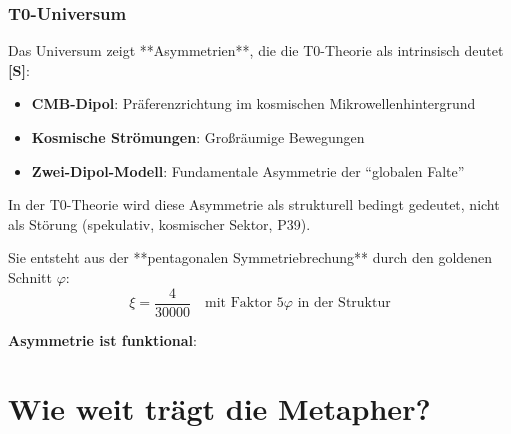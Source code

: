 	\subsubsection{T0-Universum}

	Das Universum zeigt **Asymmetrien**, die die T0-Theorie als intrinsisch deutet \textbf{[S]}:

	\begin{itemize}
		\item \textbf{CMB-Dipol}: Präferenzrichtung im kosmischen Mikrowellenhintergrund
		\item \textbf{Kosmische Strömungen}: Großräumige Bewegungen
		\item \textbf{Zwei-Dipol-Modell}: Fundamentale Asymmetrie der \enquote{globalen Falte}
	\end{itemize}

	In der T0-Theorie wird diese Asymmetrie als strukturell bedingt gedeutet, nicht als Störung (spekulativ, kosmischer Sektor, P39).

	Sie entsteht aus der **pentagonalen Symmetriebrechung** durch den goldenen Schnitt $\varphi$:
	\begin{equation}
		\xi = \frac{4}{30000} \quad \text{mit Faktor } 5\varphi \text{ in der Struktur}
	\end{equation}

	\begin{keyresult}
		\textbf{Asymmetrie ist funktional}:

		\vspace{0.3cm}

		\begin{center}
		\end{center}
	\end{keyresult}

	\section{Wie weit trägt die Metapher?}


